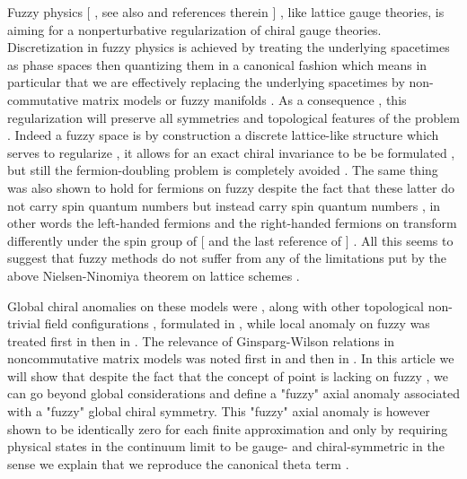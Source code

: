 \documentclass[a4paper,10pt]{article}
\begin{document}
Fuzzy physics [\cite{madore,GKP} , see also \cite{ydri} and
references therein ] , like lattice gauge theories, is aiming for
a nonperturbative regularization of chiral gauge theories.
Discretization in fuzzy physics is achieved by treating the
underlying  spacetimes as phase spaces then quantizing them in a
canonical fashion which means in particular that we are
effectively replacing the underlying spacetimes by non-commutative
matrix models or fuzzy manifolds \cite{ydri,cmlv} . As a
consequence , this regularization will preserve all symmetries
and topological features of the problem . Indeed a fuzzy space is
by construction a discrete lattice-like structure which serves to
regularize , it allows for an exact chiral invariance to be be
formulated  , but still the fermion-doubling problem is
completely avoided \cite{trg} . The same thing was also shown to
hold for fermions on fuzzy \coordHE{} despite the fact
that these latter do not carry spin quantum numbers but instead
carry spin\coordHE{} quantum numbers , in other words the left-handed
fermions and the right-handed fermions on \coordHE{}
transform differently under the spin group \coordHE{} of
\coordHE{} [ \cite{giorgio} and the last reference of
\cite{GKP} ] . All this seems to suggest that  fuzzy methods do
not suffer from any of the limitations put by the above
Nielsen-Ninomiya theorem on lattice schemes .




Global chiral anomalies on these models were  , along with other
topological non-trivial field configurations , formulated in
\cite{bal,grosse,balsach} , while local anomaly on fuzzy \coordHE{} was  treated first in \cite{presnajder} then in \cite{giorgio1,nagao2} . The relevance of Ginsparg-Wilson relations in noncommutative matrix models was noted first in \cite{trg} and \cite{miguel} then in \cite{nagao1} . In this article
we will show that despite the fact that the concept of point is
lacking on fuzzy \coordHE{}, we can go beyond global
considerations and define a "fuzzy" axial anomaly associated with
a "fuzzy" \coordHE{} global chiral symmetry. This "fuzzy" axial
anomaly is however shown to be identically zero for each finite
approximation and only by requiring physical states in the
continuum limit to be gauge- and chiral-symmetric in the sense we explain that we
reproduce the canonical theta term .
\end{document}
